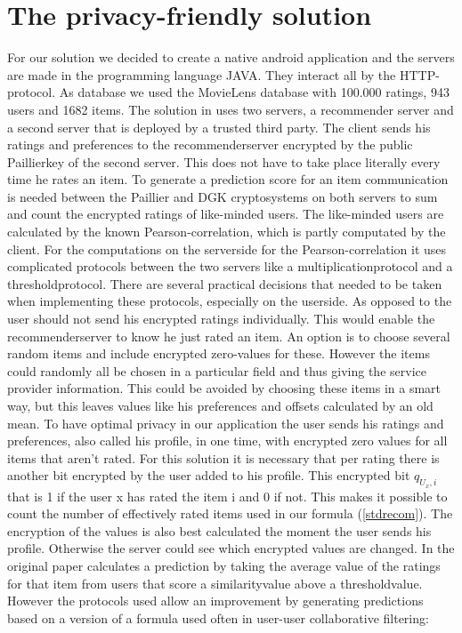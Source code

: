\documentclass[twocolumn]{phdsymp} %
\begin{document}
\section{The privacy-friendly solution}
For our solution we decided to create a native android application and the servers are made in the programming language JAVA. They interact all by the HTTP-protocol. As database we used the MovieLens database with 100.000 ratings, 943 users and 1682 items. The solution in \cite{dyn} uses two servers, a recommender server and a second server that is deployed by a trusted third party. The client sends his ratings and preferences to the recommenderserver encrypted by the public Paillierkey of the second server. This does not have to take place literally every time he rates an item. To generate a prediction score for an item communication is needed between the Paillier and DGK cryptosystems on both servers to sum and count the encrypted ratings of like-minded users. The like-minded users are calculated by the known Pearson-correlation, which is partly computated by the client. For the computations on the serverside for the Pearson-correlation it uses complicated protocols between the two servers like a multiplicationprotocol and a thresholdprotocol. There are several practical decisions that needed to be taken when implementing these protocols, especially on the userside. As opposed to \cite{dyn} the user should not send his encrypted ratings individually. This would enable the recommenderserver to know he just rated an item. An option is to choose several random items and include encrypted zero-values for these. However the items could randomly all be chosen in a particular field and thus giving the service provider information. This could be avoided by choosing these items in a smart way, but this leaves values like his preferences and offsets calculated by an old mean. To have optimal privacy in our application the user sends his ratings and preferences, also called his profile, in one time, with encrypted zero values for all items that aren't rated. For this solution it is necessary that per rating there is another bit encrypted by the user added to his profile. This encrypted bit $ q_{U_x,i} $ that is 1 if the user x has rated the item i and 0 if not. This makes it possible to count the number of effectively rated items used in our formula (\ref{stdrecom}). The encryption of the values is also best calculated the moment the user sends his profile. Otherwise the server could see which encrypted values are changed. In the original paper \cite{dyn} calculates a prediction by taking the average value of the ratings for that item from users that score a similarityvalue above a thresholdvalue. However the protocols used allow an improvement by generating predictions based on a version of a formula used often in user-user collaborative filtering:
\end{document}
